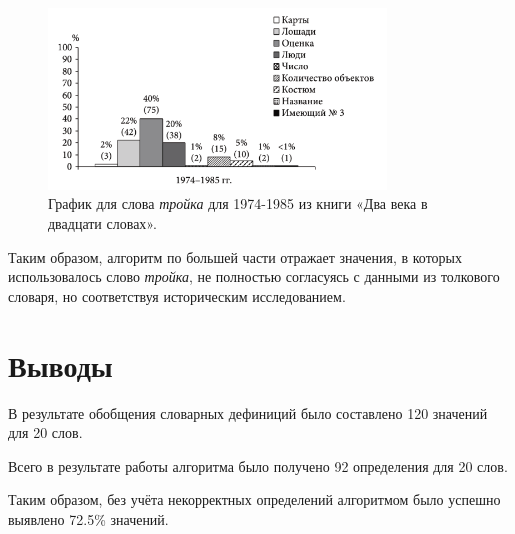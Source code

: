 \documentclass[LI,VKR]{HSEUniversity}
\begin{document}
\begin{figure}[H]
    \centering %
    \includegraphics[width=0.8\textwidth]{img/book/trojka/1974-1985}
    \caption{График для слова \textit{тройка} для 1974-1985 из книги «Два века в двадцати словах».}
\end{figure}

Таким образом, алгоритм по большей части отражает значения, в которых использовалось
слово \textit{тройка}, не полностью согласуясь с данными из толкового словаря,
но соответствуя историческим исследованием.

\section{Выводы}

В результате обобщения словарных дефиниций было составлено 120 значений для 20 слов.

Всего в результате работы алгоритма было получено 92 определения для 20 слов.

Таким образом, без учёта некорректных определений алгоритмом было успешно выявлено
72.5\% значений.
\end{document}
